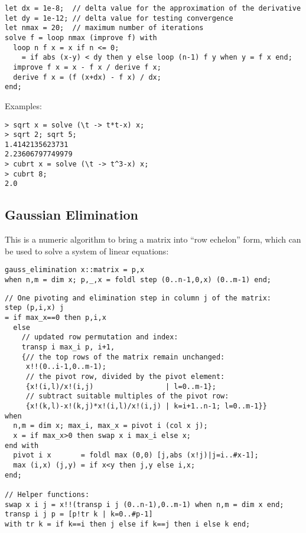 \documentclass[a4paper,12pt]{article}
\begin{document}
\begin{lstlisting}
let dx = 1e-8;  // delta value for the approximation of the derivative
let dy = 1e-12; // delta value for testing convergence
let nmax = 20;  // maximum number of iterations
solve f = loop nmax (improve f) with
  loop n f x = x if n <= 0;
    = if abs (x-y) < dy then y else loop (n-1) f y when y = f x end;
  improve f x = x - f x / derive f x;
  derive f x = (f (x+dx) - f x) / dx;
end;
\end{lstlisting}

\noindent Examples:

\begin{lstlisting}
> sqrt x = solve (\t -> t*t-x) x;
> sqrt 2; sqrt 5;
1.4142135623731
2.23606797749979
> cubrt x = solve (\t -> t^3-x) x;
> cubrt 8;
2.0
\end{lstlisting}

\subsection{Gaussian Elimination}

This is a numeric algorithm to bring a matrix into ``row echelon'' form, which
can be used to solve a system of linear equations:

\begin{lstlisting}
gauss_elimination x::matrix = p,x
when n,m = dim x; p,_,x = foldl step (0..n-1,0,x) (0..m-1) end;
\end{lstlisting}

\begin{lstlisting}
// One pivoting and elimination step in column j of the matrix:
step (p,i,x) j
= if max_x==0 then p,i,x
  else
    // updated row permutation and index:
    transp i max_i p, i+1,
    {// the top rows of the matrix remain unchanged:
     x!!(0..i-1,0..m-1);
     // the pivot row, divided by the pivot element:
     {x!(i,l)/x!(i,j)                 | l=0..m-1};
     // subtract suitable multiples of the pivot row:
     {x!(k,l)-x!(k,j)*x!(i,l)/x!(i,j) | k=i+1..n-1; l=0..m-1}}
when
  n,m = dim x; max_i, max_x = pivot i (col x j);
  x = if max_x>0 then swap x i max_i else x;
end with
  pivot i x       = foldl max (0,0) [j,abs (x!j)|j=i..#x-1];
  max (i,x) (j,y) = if x<y then j,y else i,x;
end;

// Helper functions:
swap x i j = x!!(transp i j (0..n-1),0..m-1) when n,m = dim x end;
transp i j p = [p!tr k | k=0..#p-1]
with tr k = if k==i then j else if k==j then i else k end;
\end{lstlisting}
\end{document}
